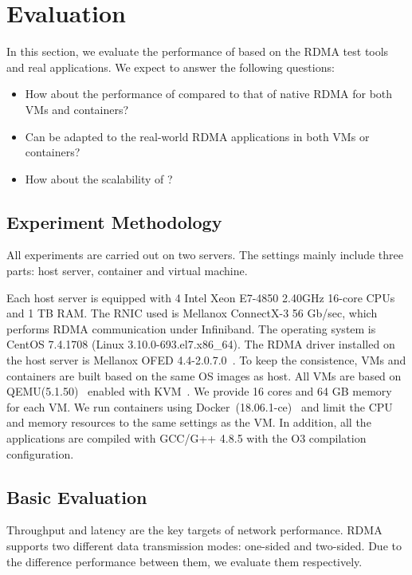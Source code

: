 \section{Evaluation} \label{eval}
In this section, we evaluate the performance of \sys based on the RDMA test tools and real applications. We expect to answer the following questions:

\begin{itemize}
\item How about the performance of \sys compared to that of native RDMA for both VMs and containers?
\item Can \sys be adapted to the real-world RDMA applications in both VMs or containers?
\item How about the scalability of \sys?
\end{itemize}

\subsection{Experiment Methodology}


All experiments are carried out on two servers. The settings mainly include three parts: host server, container and virtual machine. 

Each host server is equipped with 4 Intel Xeon E7-4850 2.40GHz 16-core CPUs and 1 TB RAM. The RNIC used is Mellanox ConnectX-3 56 Gb/sec, which performs RDMA communication under Infiniband.  The operating system is CentOS 7.4.1708 (Linux 3.10.0-693.el7.x86\_64). The RDMA driver installed on the host server is Mellanox OFED 4.4-2.0.7.0~\cite{mlnx-ofed}. To keep the consistence, VMs and containers are built based on the same OS images as host. All VMs are based on QEMU(5.1.50)~\cite{qemu} enabled with KVM~\cite{kvm}. We provide 16 cores and 64 GB memory for each VM. We run containers using Docker~(18.06.1-ce)~\cite{docker} and limit the CPU and memory resources to the same settings as the VM. In addition, all the applications are compiled with GCC/G++ 4.8.5 with the O3 compilation configuration. 


\subsection{Basic Evaluation}


Throughput and latency are the key targets of network performance. RDMA supports two different data transmission modes: one-sided and two-sided. Due to the difference performance between them, we evaluate them respectively.

